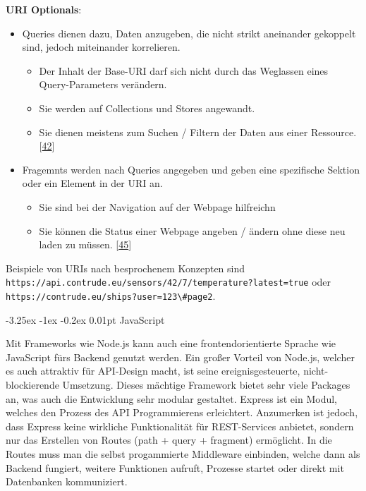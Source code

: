 \documentclass[
    headings=optiontotocandhead,%
    twoside,
    numbers=noenddot,%
    12pt, %
    titlepage, %
    parskip=full, %
    listof=leveldown, 
    numbers=noenddot, %
    a4paper,DIV=14,
    BCOR=15mm,
]{scrbook}
\makeatletter
\newcommand{\passthrough}[1]{#1}
\providecommand{\tightlist}{%
  \setlength{\itemsep}{0pt}\setlength{\parskip}{0pt}}
\renewcommand\paragraph{\@startsection{paragraph}{4}{\z@}%
    {-3.25ex \@plus -1ex \@minus -0.2ex}%
    {0.01pt}%
    {\raggedsection\normalfont\sectfont\nobreak\size@paragraph}%
  }
\makeatother
\begin{document}
\textbf{URI Optionals}:

\begin{itemize}
\tightlist
\item
  Queries dienen dazu, Daten anzugeben, die nicht strikt aneinander
  gekoppelt sind, jedoch miteinander korrelieren.

  \begin{itemize}
  \tightlist
  \item
    Der Inhalt der Base-URI darf sich nicht durch das Weglassen eines
    Query-Parameters verändern.
  \item
    Sie werden auf Collections und Stores angewandt.
  \item
    Sie dienen meistens zum Suchen / Filtern der Daten aus einer
    Ressource.
    {[}\protect\hyperlink{ref-REST-API-Design-Rulebook}{42}{]}
  \end{itemize}
\item
  Fragemnts werden nach Queries angegeben und geben eine spezifische
  Sektion oder ein Element in der URI an.

  \begin{itemize}
  \tightlist
  \item
    Sie sind bei der Navigation auf der Webpage hilfreichn
  \item
    Sie können die Status einer Webpage angeben / ändern ohne diese neu
    laden zu müssen.
    {[}\protect\hyperlink{ref-medium-uri-fragment}{45}{]}
  \end{itemize}
\end{itemize}

Beispiele von URIs nach besprochenem Konzepten sind
\passthrough{\lstinline!https://api.contrude.eu/sensors/42/7/temperature?latest=true!}
oder
\passthrough{\lstinline!https://contrude.eu/ships?user=123\#page2!}.

\hypertarget{javascript}{%
\paragraph{JavaScript}\label{javascript}}

Mit Frameworks wie Node.js kann auch eine frontendorientierte Sprache
wie JavaScript fürs Backend genutzt werden. Ein großer Vorteil von
Node.js, welcher es auch attraktiv für API-Design macht, ist seine
ereignisgesteuerte, nicht-blockierende Umsetzung. Dieses mächtige
Framework bietet sehr viele Packages an, was auch die Entwicklung sehr
modular gestaltet. Express ist ein Modul, welches den Prozess des API
Programmierens erleichtert. Anzumerken ist jedoch, dass Express keine
wirkliche Funktionalität für REST-Services anbietet, sondern nur das
Erstellen von Routes (path + query + fragment) ermöglicht. In die Routes
muss man die selbst progammierte Middleware einbinden, welche dann als
Backend fungiert, weitere Funktionen aufruft, Prozesse startet oder
direkt mit Datenbanken kommuniziert.
\end{document}
